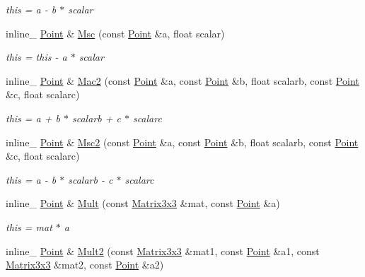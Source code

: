 \begin{DoxyCompactItemize}
\begin{DoxyCompactList}\small\item\em this = a -\/ b $\ast$ scalar \end{DoxyCompactList}\item 
inline\+\_\+ \hyperlink{classPoint}{Point} \& \hyperlink{classPoint_aaf6db3642124908e9e01f10612b1b7d6}{Msc} (const \hyperlink{classPoint}{Point} \&a, float scalar)\hypertarget{classPoint_aaf6db3642124908e9e01f10612b1b7d6}{}\label{classPoint_aaf6db3642124908e9e01f10612b1b7d6}

\begin{DoxyCompactList}\small\item\em this = this -\/ a $\ast$ scalar \end{DoxyCompactList}\item 
inline\+\_\+ \hyperlink{classPoint}{Point} \& \hyperlink{classPoint_ac60c49b6912aa0ca87c914a253ef45d5}{Mac2} (const \hyperlink{classPoint}{Point} \&a, const \hyperlink{classPoint}{Point} \&b, float scalarb, const \hyperlink{classPoint}{Point} \&c, float scalarc)\hypertarget{classPoint_ac60c49b6912aa0ca87c914a253ef45d5}{}\label{classPoint_ac60c49b6912aa0ca87c914a253ef45d5}

\begin{DoxyCompactList}\small\item\em this = a + b $\ast$ scalarb + c $\ast$ scalarc \end{DoxyCompactList}\item 
inline\+\_\+ \hyperlink{classPoint}{Point} \& \hyperlink{classPoint_a2ee343e02b3298ec343c6c8ac2909f3e}{Msc2} (const \hyperlink{classPoint}{Point} \&a, const \hyperlink{classPoint}{Point} \&b, float scalarb, const \hyperlink{classPoint}{Point} \&c, float scalarc)\hypertarget{classPoint_a2ee343e02b3298ec343c6c8ac2909f3e}{}\label{classPoint_a2ee343e02b3298ec343c6c8ac2909f3e}

\begin{DoxyCompactList}\small\item\em this = a -\/ b $\ast$ scalarb -\/ c $\ast$ scalarc \end{DoxyCompactList}\item 
inline\+\_\+ \hyperlink{classPoint}{Point} \& \hyperlink{classPoint_ad94c6ba94f4ef1f76dbf6ea7a054d982}{Mult} (const \hyperlink{classMatrix3x3}{Matrix3x3} \&mat, const \hyperlink{classPoint}{Point} \&a)\hypertarget{classPoint_ad94c6ba94f4ef1f76dbf6ea7a054d982}{}\label{classPoint_ad94c6ba94f4ef1f76dbf6ea7a054d982}

\begin{DoxyCompactList}\small\item\em this = mat $\ast$ a \end{DoxyCompactList}\item 
inline\+\_\+ \hyperlink{classPoint}{Point} \& \hyperlink{classPoint_a3b3545690f65e79688c032a4aa35c722}{Mult2} (const \hyperlink{classMatrix3x3}{Matrix3x3} \&mat1, const \hyperlink{classPoint}{Point} \&a1, const \hyperlink{classMatrix3x3}{Matrix3x3} \&mat2, const \hyperlink{classPoint}{Point} \&a2)\hypertarget{classPoint_a3b3545690f65e79688c032a4aa35c722}{}\label{classPoint_a3b3545690f65e79688c032a4aa35c722}


\end{DoxyCompactItemize}

